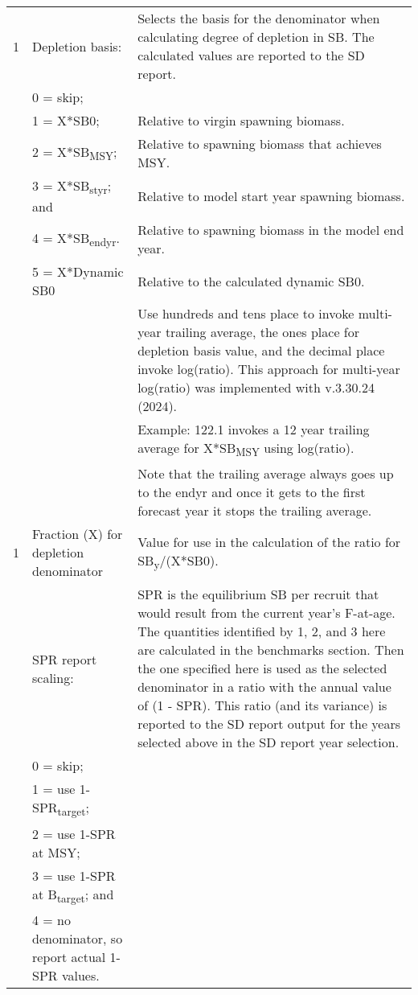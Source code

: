 {\begin{landscape}
\begin{longtable}{p{1.5cm} p{7.2cm} p{12.3cm}}
 \hline
 1 & Depletion basis: & \multirow{1}{1cm}[-0.25cm]{\parbox{12.5cm}{Selects the basis for the denominator when calculating degree of depletion in SB. The calculated values are reported to the SD report.}} \Tstrut\\
   & 0 = skip; & \\
   & 1 = X*SB0; & Relative to virgin spawning biomass. \\
   & 2 = X*SB\textsubscript{MSY}; & Relative to spawning biomass that achieves MSY. \\
   & 3 = X*SB\textsubscript{styr}; and & Relative to model start year spawning biomass. \\
   & 4 = X*SB\textsubscript{endyr}. & Relative to spawning biomass in the model end year. \\
   & 5 = X*Dynamic SB0 & Relative to the calculated dynamic SB0. \\
   & & Use hundreds and tens place to invoke multi-year trailing average, the ones place for depletion basis value, and the decimal place invoke log(ratio). This approach for multi-year log(ratio) was implemented with v.3.30.24 (2024). \\
   & & Example: 122.1 invokes a 12 year trailing average for X*SB\textsubscript{MSY} using log(ratio). \\
   & & Note that the trailing average always goes up to the endyr and once it gets to the first forecast year it stops the trailing average. \Bstrut\\
  
 \hline
 1 & Fraction (X) for depletion denominator & Value for use in the calculation of the ratio for SB\textsubscript{y}/(X*SB0). \Tstrut\Bstrut\\

 \pagebreak
 1 & SPR report scaling: & \multirow{1}{1cm}[-0.25cm]{\parbox{12.5cm}{SPR is the equilibrium SB per recruit that would result from the current year's F-at-age. The quantities identified by 1, 2, and 3 here are calculated in the benchmarks section. Then the one specified here is used as the selected denominator in a ratio with the annual value of (1 - SPR). This ratio (and its variance) is reported to the SD report output for the years selected above in the SD report year selection.}} \Tstrut\\
   & 0 = skip; & \\
   & 1 = use 1-SPR\textsubscript{target}; & \\
   & 2 = use 1-SPR at MSY; & \Tstrut\\
   & 3 = use 1-SPR at B\textsubscript{target}; and &  \Tstrut\\
   & 4 = no denominator, so report actual 1-SPR values. & \\
  

\end{longtable}
\end{landscape}}
